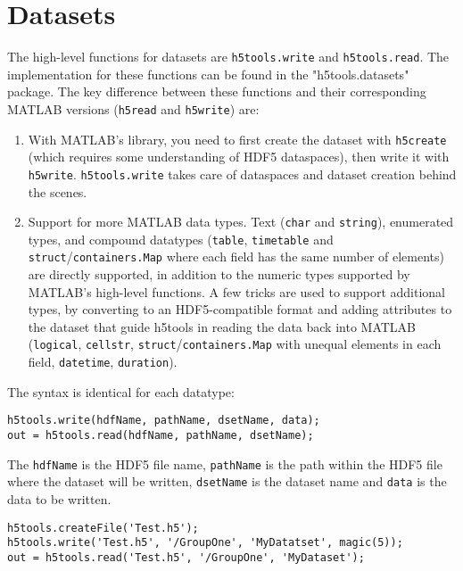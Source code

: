 \documentclass[11pt]{exam}
\newcommand\myfcn[1]{\colorbox{codegray}{\textcolor{codeblue}{\texttt{#1}}}}
\newcommand\matfcn[1]{\textcolor{darkteal}{\texttt{#1}}}
\begin{document}
    \section{Datasets}\label{sec:Datasets}
        \noindent The high-level functions for datasets are \myfcn{h5tools.write} and \myfcn{h5tools.read}. The implementation for these functions can be found in the "h5tools.datasets" package. The key difference between these functions and their corresponding MATLAB versions (\matfcn{h5read} and \matfcn{h5write}) are:
        \begin{enumerate}
            \item With MATLAB's library, you need to first create the dataset with \myfcn{h5create} (which requires some understanding of HDF5 dataspaces), then write it with \matfcn{h5write}. \myfcn{h5tools.write} takes care of dataspaces and dataset creation behind the scenes. 
            \item Support for more MATLAB data types. Text (\texttt{char} and \texttt{string}), enumerated types, and compound datatypes (\texttt{table}, \texttt{timetable} and \texttt{struct}/\texttt{containers.Map} where each field has the same number of elements) are directly supported, in addition to the numeric types supported by MATLAB's high-level functions. A few tricks are used to support additional types, by converting to an HDF5-compatible format and adding attributes to the dataset that guide h5tools in reading the data back into MATLAB (\texttt{logical}, \texttt{cellstr}, \texttt{struct}/\texttt{containers.Map} with unequal elements in each field, \texttt{datetime}, \texttt{duration}).  
        \end{enumerate}
        $\quad$\\
		The syntax is identical for each datatype:
		\begin{lstlisting}[style=matlab-editor, basicstyle=\mlttfamily\footnotesize]
h5tools.write(hdfName, pathName, dsetName, data);
out = h5tools.read(hdfName, pathName, dsetName);
		\end{lstlisting}
		The \texttt{hdfName} is the HDF5 file name, \texttt{pathName} is the path within the HDF5 file where the dataset will be written, \texttt{dsetName} is the dataset name and \texttt{data} is the data to be written.
		\begin{lstlisting}[style=matlab-editor, basicstyle=\mlttfamily\footnotesize]
% Write a dataset named 'MyDatatset' to' GroupOne'
h5tools.createFile('Test.h5');
h5tools.write('Test.h5', '/GroupOne', 'MyDatatset', magic(5));
out = h5tools.read('Test.h5', '/GroupOne', 'MyDataset');
		\end{lstlisting}
\end{document}
